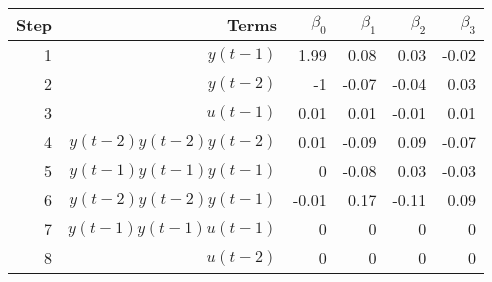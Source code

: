 \begin{tabular}{rrrrrr}
Step & Terms & $\beta_{0}$ & $\beta_{1}$ & $\beta_{2}$ & $\beta_{3}$ \\ 
\hline 
1 & $y(t-1)$ & 1.99 & 0.08 & 0.03 & -0.02 \\ 
2 & $y(t-2)$ & -1 & -0.07 & -0.04 & 0.03 \\ 
3 & $u(t-1)$ & 0.01 & 0.01 & -0.01 & 0.01 \\ 
4 & $y(t-2)y(t-2)y(t-2)$ & 0.01 & -0.09 & 0.09 & -0.07 \\ 
5 & $y(t-1)y(t-1)y(t-1)$ & 0 & -0.08 & 0.03 & -0.03 \\ 
6 & $y(t-2)y(t-2)y(t-1)$ & -0.01 & 0.17 & -0.11 & 0.09 \\ 
7 & $y(t-1)y(t-1)u(t-1)$ & 0 & 0 & 0 & 0 \\ 
8 & $u(t-2)$ & 0 & 0 & 0 & 0 \\ 
\hline 
\end{tabular}